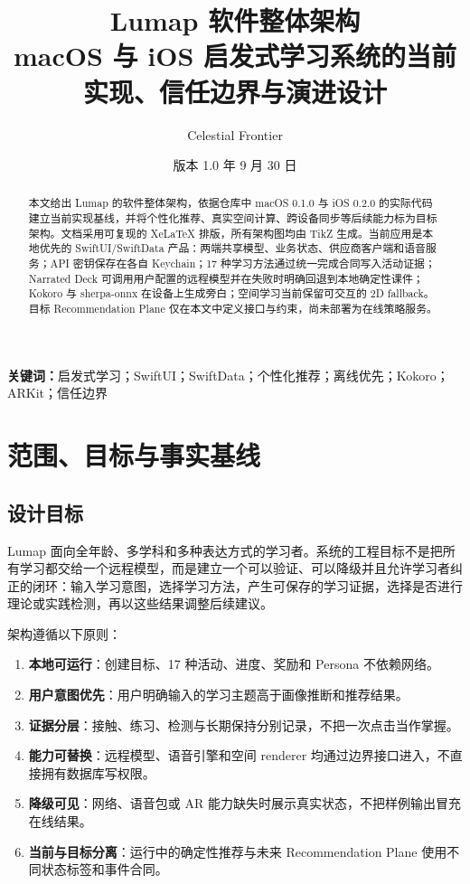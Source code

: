 \documentclass[11pt,a4paper,fontset=none]{ctexart}
\title{\bfseries\sffamily Lumap 软件整体架构\\[0.35em]
\large macOS 与 iOS 启发式学习系统的当前实现、信任边界与演进设计}
\author{Celestial Frontier}
\date{版本 1.0 \quad 2026 年 9 月 30 日}
\newcommand{\term}[1]{\textbf{#1}}
\begin{document}
\maketitle

\begin{abstract}
本文给出 Lumap 的软件整体架构，依据仓库中 macOS 0.1.0 与 iOS 0.2.0 的实际代码建立当前实现基线，并将个性化推荐、真实空间计算、跨设备同步等后续能力标为目标架构。文档采用可复现的 XeLaTeX 排版，所有架构图均由 TikZ 生成。当前应用是本地优先的 SwiftUI/SwiftData 产品：两端共享模型、业务状态、供应商客户端和语音服务；API 密钥保存在各自 Keychain；17 种学习方法通过统一完成合同写入活动证据；Narrated Deck 可调用用户配置的远程模型并在失败时明确回退到本地确定性课件；Kokoro 与 sherpa-onnx 在设备上生成旁白；空间学习当前保留可交互的 2D fallback。目标 Recommendation Plane 仅在本文中定义接口与约束，尚未部署为在线策略服务。
\end{abstract}

\noindent\textbf{关键词：}启发式学习；SwiftUI；SwiftData；个性化推荐；离线优先；Kokoro；ARKit；信任边界

\vspace{0.8em}
\noindent{}

\tableofcontents
\clearpage

\section{范围、目标与事实基线}

\subsection{设计目标}
Lumap 面向全年龄、多学科和多种表达方式的学习者。系统的工程目标不是把所有学习都交给一个远程模型，而是建立一个可以验证、可以降级并且允许学习者纠正的闭环：输入学习意图，选择学习方法，产生可保存的学习证据，选择是否进行理论或实践检测，再以这些结果调整后续建议。

架构遵循以下原则：
\begin{enumerate}
  \item \term{本地可运行}：创建目标、17 种活动、进度、奖励和 Persona 不依赖网络。
  \item \term{用户意图优先}：用户明确输入的学习主题高于画像推断和推荐结果。
  \item \term{证据分层}：接触、练习、检测与长期保持分别记录，不把一次点击当作掌握。
  \item \term{能力可替换}：远程模型、语音引擎和空间 renderer 均通过边界接口进入，不直接拥有数据库写权限。
  \item \term{降级可见}：网络、语音包或 AR 能力缺失时展示真实状态，不把样例输出冒充在线结果。
  \item \term{当前与目标分离}：运行中的确定性推荐与未来 Recommendation Plane 使用不同状态标签和事件合同。
\end{enumerate}
\end{document}
